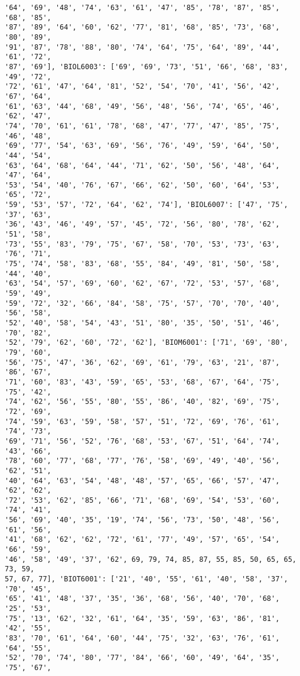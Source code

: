 \documentclass[11pt]{article}
\begin{document}
\begin{Verbatim}[commandchars=\\\{\}]
'64', '69', '48', '74', '63', '61', '47', '85', '78', '87', '85', '68', '85',
'87', '89', '64', '60', '62', '77', '81', '68', '85', '73', '68', '80', '89',
'91', '87', '78', '88', '80', '74', '64', '75', '64', '89', '44', '61', '72',
'87', '69'], 'BIOL6003': ['69', '69', '73', '51', '66', '68', '83', '49', '72',
'72', '61', '47', '64', '81', '52', '54', '70', '41', '56', '42', '67', '64',
'61', '63', '44', '68', '49', '56', '48', '56', '74', '65', '46', '62', '47',
'74', '70', '61', '61', '78', '68', '47', '77', '47', '85', '75', '46', '48',
'69', '77', '54', '63', '69', '56', '76', '49', '59', '64', '50', '44', '54',
'63', '64', '68', '64', '44', '71', '62', '50', '56', '48', '64', '47', '64',
'53', '54', '40', '76', '67', '66', '62', '50', '60', '64', '53', '65', '72',
'59', '53', '57', '72', '64', '62', '74'], 'BIOL6007': ['47', '75', '37', '63',
'36', '43', '46', '49', '57', '45', '72', '56', '80', '78', '62', '51', '58',
'73', '55', '83', '79', '75', '67', '58', '70', '53', '73', '63', '76', '71',
'75', '74', '58', '83', '68', '55', '84', '49', '81', '50', '58', '44', '40',
'63', '54', '57', '69', '60', '62', '67', '72', '53', '57', '68', '59', '49',
'59', '72', '32', '66', '84', '58', '75', '57', '70', '70', '40', '56', '58',
'52', '40', '58', '54', '43', '51', '80', '35', '50', '51', '46', '70', '82',
'52', '79', '62', '60', '72', '62'], 'BIOM6001': ['71', '69', '80', '79', '60',
'56', '75', '47', '36', '62', '69', '61', '79', '63', '21', '87', '86', '67',
'71', '60', '83', '43', '59', '65', '53', '68', '67', '64', '75', '75', '42',
'74', '62', '56', '55', '80', '55', '86', '40', '82', '69', '75', '72', '69',
'74', '59', '63', '59', '58', '57', '51', '72', '69', '76', '61', '74', '73',
'69', '71', '56', '52', '76', '68', '53', '67', '51', '64', '74', '43', '66',
'78', '60', '77', '68', '77', '76', '58', '69', '49', '40', '56', '62', '51',
'40', '64', '63', '54', '48', '48', '57', '65', '66', '57', '47', '62', '62',
'72', '53', '62', '85', '66', '71', '68', '69', '54', '53', '60', '74', '41',
'56', '69', '40', '35', '19', '74', '56', '73', '50', '48', '56', '61', '56',
'41', '68', '62', '62', '72', '61', '77', '49', '57', '65', '54', '66', '59',
'46', '58', '49', '37', '62', 69, 79, 74, 85, 87, 55, 85, 50, 65, 65, 73, 59,
57, 67, 77], 'BIOT6001': ['21', '40', '55', '61', '40', '58', '37', '70', '45',
'65', '41', '48', '37', '35', '36', '68', '56', '40', '70', '68', '25', '53',
'75', '13', '62', '32', '61', '64', '35', '59', '63', '86', '81', '42', '55',
'83', '70', '61', '64', '60', '44', '75', '32', '63', '76', '61', '64', '55',
'52', '70', '74', '80', '77', '84', '66', '60', '49', '64', '35', '75', '67',

\end{Verbatim}
\end{document}
